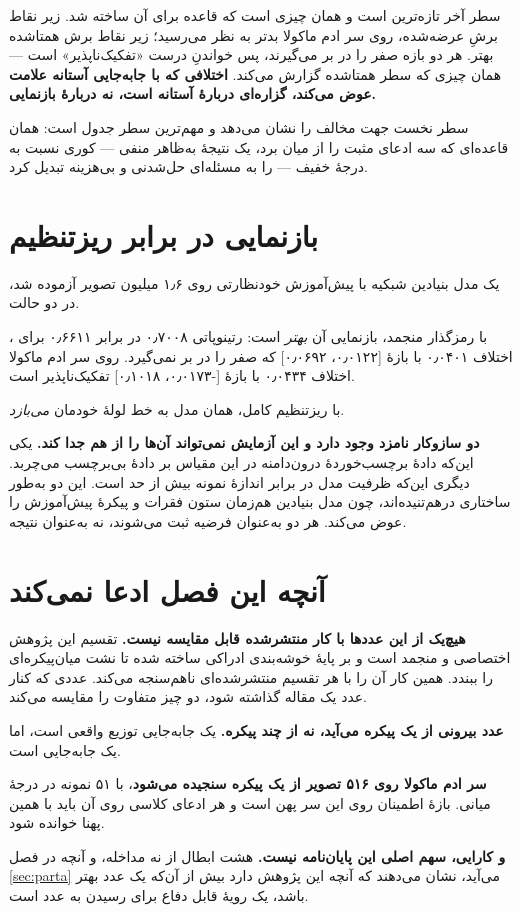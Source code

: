 سطر آخر تازه‌ترین است و همان چیزی است که قاعده برای آن ساخته شد. زیر نقاط برشِ عرضه‌شده،
 روی سر ادم ماکولا بدتر به نظر می‌رسید؛ زیر نقاط برش همتاشده بهتر. هر دو بازه
صفر را در بر می‌گیرند، پس خواندنِ درست «تفکیک‌ناپذیر» است — همان چیزی که سطر همتاشده گزارش
می‌کند. \textbf{اختلافی که با جابه‌جایی آستانه علامت عوض می‌کند، گزاره‌ای دربارهٔ آستانه
است، نه دربارهٔ بازنمایی.}

سطر نخست جهت مخالف را نشان می‌دهد و مهم‌ترین سطر جدول است: همان قاعده‌ای که سه ادعای مثبت را
از میان برد، یک نتیجهٔ به‌ظاهر منفی — کوری نسبت به درجهٔ خفیف — را به مسئله‌ای حل‌شدنی و
بی‌هزینه تبدیل کرد.

\section{بازنمایی در برابر ریزتنظیم}
\label{sec:retfound}

یک مدل بنیادین شبکیه با پیش‌آموزش خودنظارتی روی \num{۱٫۶} میلیون تصویر آزموده شد، در دو حالت.

با رمزگذار منجمد، بازنمایی آن \emph{بهتر} است:  رتینوپاتی \num{۰٫۷۰۰۸} در برابر \num{۰٫۶۶۱۱} برای
، اختلاف \num{۰٫۰۴۰۱} با بازهٔ [\num{۰٫۰۱۲۲}، \num{۰٫۰۶۹۲}] که صفر را در بر نمی‌گیرد. روی سر ادم
ماکولا اختلاف \num{۰٫۰۴۳۴} با بازهٔ [-\num{۰٫۰۱۷۳}، \num{۰٫۱۰۱۸}] تفکیک‌ناپذیر است.

با ریزتنظیم کامل، همان مدل به خط لولهٔ خودمان \emph{می‌بازد}.

\textbf{دو سازوکار نامزد وجود دارد و این آزمایش نمی‌تواند آن‌ها را از هم جدا کند.} یکی این‌که
دادهٔ برچسب‌خوردهٔ درون‌دامنه در این مقیاس بر دادهٔ بی‌برچسب می‌چربد. دیگری این‌که ظرفیت مدل
در برابر اندازهٔ نمونه بیش از حد است. این دو به‌طور ساختاری درهم‌تنیده‌اند، چون مدل بنیادین
هم‌زمان ستون فقرات و پیکرهٔ پیش‌آموزش را عوض می‌کند. هر دو به‌عنوان فرضیه ثبت می‌شوند، نه
به‌عنوان نتیجه.

\section{آنچه این فصل ادعا نمی‌کند}
\label{sec:limits}

\textbf{هیچ‌یک از این عددها با کار منتشرشده قابل مقایسه نیست.} تقسیم این پژوهش اختصاصی و منجمد
است و بر پایهٔ خوشه‌بندی ادراکی ساخته شده تا نشت میان‌پیکره‌ای را ببندد. همین کار آن را با هر
تقسیم منتشرشده‌ای ناهم‌سنجه می‌کند. عددی که کنار عدد یک مقاله گذاشته شود، دو چیز متفاوت را
مقایسه می‌کند.

\textbf{عدد بیرونی از یک پیکره می‌آید، نه از چند پیکره.}  یک جابه‌جایی توزیع واقعی
است، اما یک جابه‌جایی است.

\textbf{سر ادم ماکولا روی \num{۵۱۶} تصویر از یک پیکره سنجیده می‌شود}، با \num{۵۱} نمونه در درجهٔ میانی.
بازهٔ اطمینان روی این سر پهن است و هر ادعای کلاسی روی آن باید با همین پهنا خوانده شود.

\textbf{و کارایی، سهم اصلی این پایان‌نامه نیست.} هشت ابطال از نه مداخله، و آنچه در فصل
\ref{sec:parta} می‌آید، نشان می‌دهند که آنچه این پژوهش دارد بیش از آن‌که یک عدد بهتر باشد، یک
رویهٔ قابل دفاع برای رسیدن به عدد است.
